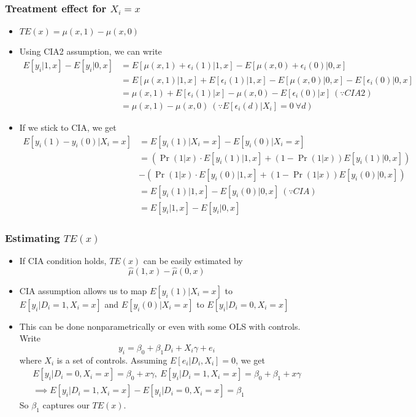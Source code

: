 \documentclass[aspectratio=169]{beamer}
\begin{document}
\begin{frame}
\frametitle{Treatment effect for $X_i=x$}
\begin{itemize}
\item $TE(x)=\mu(x,1)-\mu(x, 0)$
\item Using CIA2 assumption, we can write 
\small{\[
\begin{aligned}
E[y_i|1, x]-E[y_i|0, x]&=E[\mu(x,1)+\epsilon_i(1)|1, x]-E[\mu(x,0)+\epsilon_i(0)|0, x]\\
&=E[\mu(x,1)|1, x]+E[\epsilon_i(1)|1, x]-E[\mu(x,0)|0, x]-E[\epsilon_i(0)|0, x]\\
&=\mu(x,1)+E[\epsilon_i(1)|x]-\mu(x,0)-E[\epsilon_i(0)|x] \ (\because CIA2)\\
&=\mu(x,1)-\mu(x,0) \ (\because  E[\epsilon_i(d)|X_i]=0  \ \forall d)
\end{aligned}
\]}\normalsize
\item If we stick to CIA, we get 
\small{\begin{align*}
E[y_i(1)-y_i(0)|X_i=x] &= E[y_i(1)|X_i=x]- E[y_i(0)|X_i=x]\\
&=(\Pr(1|x)\cdot E[y_i(1)|1,x]+(1-\Pr(1|x))E[y_i(1)|0,x])\\
&-(\Pr(1|x)\cdot E[y_i(0)|1,x]+(1-\Pr(1|x))E[y_i(0)|0,x])\\
&=  E[y_i(1)|1,x]- E[y_i(0)|0,x] \ (\because CIA) \\
&=  E[y_i|1, x]-E[y_i|0, x]
\end{align*}}\normalsize
\end{itemize}
\end{frame}

\begin{frame}
\frametitle{Estimating $TE(x)$}
\begin{itemize}
\item If CIA condition holds, $TE(x)$ can be easily estimated by
\[
\hat{\mu}(1,x)-\hat{\mu}(0,x)
\]
\item CIA assumption allows us to map $ E[y_i(1)|X_i=x]$ to $ E[y_i|D_i=1, X_i=x]$ and $E[y_i(0)|X_i=x]$ to $ E[y_i|D_i=0, X_i=x]$
\item This can be done nonparametrically or even with some OLS with controls. Write
\[
y_ i =\beta_0+\beta_1D_i+X_i\gamma+e_i
\]
where $X_i$ is a set of controls. Assuming $E[e_i | D_i,X_i]=0$, we get
\begin{gather*}
E[y_i|D_i=0, X_i=x]=\beta_0+x\gamma,\  E[y_i|D_i=1, X_i=x]=\beta_0+\beta_1+x\gamma \\
\implies E[y_i|D_i=1, X_i=x] - E[y_i|D_i=0, X_i=x] = \beta_1
\end{gather*}
So $\beta_1$ captures our $TE(x)$. 
\end{itemize}
\end{frame}
\end{document}
